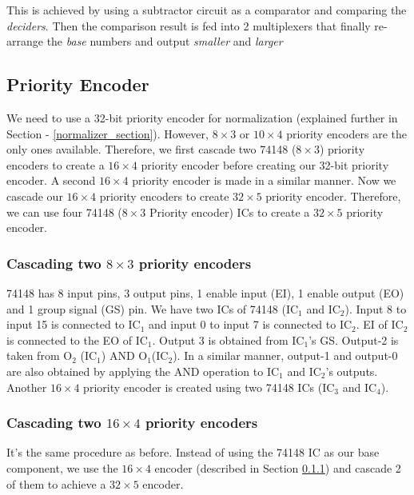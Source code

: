 \documentclass[14pt]{article}
\begin{document}
This is achieved by using a subtractor circuit as a comparator and comparing the \textit{deciders}. Then the comparison result is fed into 2 multiplexers that finally re-arrange the \textit{base} numbers and output \textit{smaller} and \textit{larger}

\subsection{Priority Encoder}
We need to use a 32-bit priority encoder for normalization (explained further in Section - \ref{normalizer_section}). However, $8\times3$ or $10\times4$ priority encoders are the only ones available.  Therefore, we first cascade two 74148 ($8\times3$) priority encoders to create a $16 \times 4$ priority encoder before creating our 32-bit priority encoder. A second $16\times4$ priority encoder is made in a similar manner. Now we cascade our $16\times4$ priority encoders to create $32 \times 5$ priority encoder. Therefore, we can use four 74148 ($8\times3$ Priority encoder) ICs to create a $32\times5$ priority encoder.

\subsubsection{Cascading two $8\times3$ priority encoders}\label{16_encoder_subsection}
74148 has 8 input pins, 3 output pins, 1 enable input (EI), 1 enable output (EO) and 1 group signal (GS) pin. We have two ICs of 74148 ($\textrm{IC}_1$ and $\textrm{IC}_2$). Input 8 to input 15 is connected to $\textrm{IC}_1$ and input 0 to input 7 is connected to $\textrm{IC}_2$.  EI of $\textrm{IC}_2$ is connected to the EO of $\textrm{IC}_1$. Output 3 is obtained from $\textrm{IC}_1$'s GS. Output-2 is taken from $\textrm{O}_2$ ($\textrm{IC}_1$) AND $\textrm{O}_1$($\textrm{IC}_2$). In a similar manner, output-1 and output-0 are also obtained by applying the AND operation to $\textrm{IC}_1$ and $\textrm{IC}_2$'s outputs. Another $16\times4$ priority encoder is created using two 74148 ICs ($\textrm{IC}_3$ and $\textrm{IC}_4$).

\subsubsection{Cascading two $16\times4$ priority encoders}\label{32_encoder_subsection}
It's the same procedure as before. Instead of using the 74148 IC as our base component, we use the $16\times4$ encoder (described in Section \ref{16_encoder_subsection}) and cascade 2 of them to achieve a $32\times5$ encoder.\\
\end{document}
